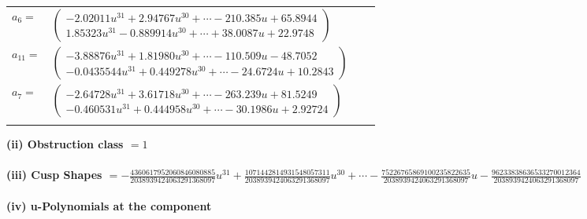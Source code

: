 \documentclass[1p]{elsarticle_modified}
\theoremstyle{definition}
\begin{document}
\begin{tabular}{m{7pt} m{180pt} m{7pt} m{180pt} }
\flushright $a_{6}=$&$\begin{pmatrix}-2.02011 u^{31}+2.94767 u^{30}+\cdots-210.385 u+65.8944\\1.85323 u^{31}-0.889914 u^{30}+\cdots+38.0087 u+22.9748\end{pmatrix}$ \\
\flushright $a_{11}=$&$\begin{pmatrix}-3.88876 u^{31}+1.81980 u^{30}+\cdots-110.509 u-48.7052\\-0.0435544 u^{31}+0.449278 u^{30}+\cdots-24.6724 u+10.2843\end{pmatrix}$ \\
\flushright $a_{7}=$&$\begin{pmatrix}-2.64728 u^{31}+3.61718 u^{30}+\cdots-263.239 u+81.5249\\-0.460531 u^{31}+0.444958 u^{30}+\cdots-30.1986 u+2.92724\end{pmatrix}$\\&\end{tabular}
\flushleft \textbf{(ii) Obstruction class $= 1$}\\~\\
\flushleft \textbf{(iii) Cusp Shapes $= -\frac{4360617952060846080885}{2038939424063291368097} u^{31}+\frac{1071442814931548057311}{2038939424063291368097} u^{30}+\cdots-\frac{75226765869100235822635}{2038939424063291368097} u-\frac{96233838636533270012364}{2038939424063291368097}$}\\~\\
\newpage\renewcommand{\arraystretch}{1}
\flushleft \textbf{(iv) u-Polynomials at the component}\newline \\
\end{document}
